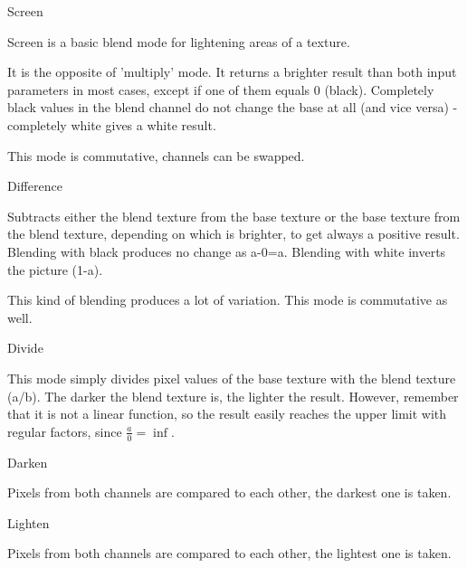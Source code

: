 Screen

Screen is a basic blend mode for lightening areas of a texture.

It is the opposite of 'multiply' mode. It returns a brighter result than both input parameters in most cases, except if one of them equals 0 (black). Completely black values in the blend channel do not change the base at all (and vice versa) - completely white gives a white result.

This mode is commutative, channels can be swapped.

Difference

Subtracts either the blend texture from the base texture or the base texture from the blend texture, depending on which is brighter, to get always a positive result. Blending with black produces no change as a-0=a. Blending with white inverts the picture (1-a).

This kind of blending produces a lot of variation. This mode is commutative as well.

Divide

This mode simply divides pixel values of the base texture with the blend texture (a/b). The darker the blend texture is, the lighter the result. However, remember that it is not a linear function, so the result easily reaches the upper limit with regular factors, since $\tfrac{a}{0}=\inf$.

Darken

Pixels from both channels are compared to each other, the darkest one is taken.

Lighten

Pixels from both channels are compared to each other, the lightest one is taken.
